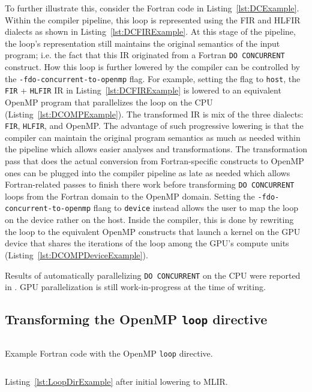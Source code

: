 \documentclass[acmtog,natbib=false]{acmart}
\newcommand{\code}[1]{\texttt{#1}\xspace}
\begin{document}
To further illustrate this, consider the Fortran code in Listing~\ref{lst:DCExample}.
Within the compiler pipeline, this loop is represented using the \ac{FIR} and \ac{HLFIR} dialects as shown in Listing~\ref{lst:DCFIRExample}.
At this stage of the pipeline, the loop's representation still maintains the original semantics of the input program; i.e. the fact that this IR originated from a Fortran \code{DO CONCURRENT} construct.
How this loop is further lowered by the compiler can be controlled by the \code{-fdo-concurrent-to-openmp} flag.
For example, setting the flag to \code{host}, the \code{FIR} + \code{HLFIR} IR in Listing~\ref{lst:DCFIRExample} is lowered to an equivalent OpenMP program that parallelizes the loop on the CPU (Listing~\ref{lst:DCOMPExample}).
The transformed IR is mix of the three dialects: \code{FIR}, \code{HLFIR}, and OpenMP.
The advantage of such progressive lowering is that the compiler can maintain the original program semantics as much as needed within the pipeline which allows easier analyses and transformations.
The transformation pass that does the actual conversion from Fortran-specific constructs to OpenMP ones can be plugged into the compiler pipeline as late as needed which allows Fortran-related passes to finish there work before transforming \code{DO CONCURRENT} loops from the Fortran domain to the OpenMP domain.
Setting the \code{-fdo-concurrent-to-openmp} flang to \code{device} instead allows the user to map the loop on the device rather on the host.
Inside the compiler, this is done by rewriting the loop to the equivalent OpenMP constructs that launch a kernel on the GPU device that shares the iterations of the loop among the GPU's compute units (Listing~\ref{lst:DCOMPDeviceExample}).

Results of automatically parallelizing \code{DO CONCURRENT} on the CPU were reported in \cite{rouson2025automatically}. GPU parallelization is still work-in-progress at the time of writing.

\subsection{Transforming the OpenMP \code{loop} directive}

\begin{listing}[t]
\inputminted{Fortran}{code/loop_dir_reduction.f90}
\caption{Example Fortran code with the OpenMP \code{loop} directive.}
\label{lst:LoopDirExample}
\end{listing}

\begin{listing}[t]
\inputminted{MLIR-lexer.py:MlirLexer -x}{code/loop_dir_reduction.mlir}
\caption{Listing~\ref{lst:LoopDirExample} after initial lowering to MLIR.}
\label{lst:LoopDirMLIRExample}
\end{listing}
\end{document}
